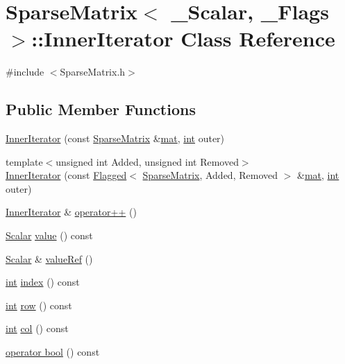 \hypertarget{class_sparse_matrix_1_1_inner_iterator}{\section{Sparse\-Matrix$<$ \-\_\-\-Scalar, \-\_\-\-Flags $>$\-:\-:Inner\-Iterator Class Reference}
\label{class_sparse_matrix_1_1_inner_iterator}
}


{\ttfamily \#include $<$Sparse\-Matrix.\-h$>$}

\subsection*{Public Member Functions}
\begin{DoxyCompactItemize}
\item 
\hyperlink{class_sparse_matrix_1_1_inner_iterator_a17d46297e038b9ec586d19691acdfbfc}{Inner\-Iterator} (const \hyperlink{class_sparse_matrix}{Sparse\-Matrix} \&\hyperlink{uavobjecttemplate_8m_a16a51e808b16c46bbfd36da2e37cd123}{mat}, \hyperlink{ioapi_8h_a787fa3cf048117ba7123753c1e74fcd6}{int} outer)
\item 
{\footnotesize template$<$unsigned int Added, unsigned int Removed$>$ }\\\hyperlink{class_sparse_matrix_1_1_inner_iterator_a15daabe1833b34570420fa92ba33ef6c}{Inner\-Iterator} (const \hyperlink{class_flagged}{Flagged}$<$ \hyperlink{class_sparse_matrix}{Sparse\-Matrix}, Added, Removed $>$ \&\hyperlink{uavobjecttemplate_8m_a16a51e808b16c46bbfd36da2e37cd123}{mat}, \hyperlink{ioapi_8h_a787fa3cf048117ba7123753c1e74fcd6}{int} outer)
\item 
\hyperlink{class_sparse_matrix_1_1_inner_iterator}{Inner\-Iterator} \& \hyperlink{class_sparse_matrix_1_1_inner_iterator_aa5b23a73432afc4b61cc89521793e516}{operator++} ()
\item 
\hyperlink{class_sparse_matrix_base_af39d70f2b7e775e9e17b666cd24128c8}{Scalar} \hyperlink{class_sparse_matrix_1_1_inner_iterator_a95b8f199da2962ce75be20ee8e9358bc}{value} () const 
\item 
\hyperlink{class_sparse_matrix_base_af39d70f2b7e775e9e17b666cd24128c8}{Scalar} \& \hyperlink{class_sparse_matrix_1_1_inner_iterator_a746bab482d56839f89536dad351ed559}{value\-Ref} ()
\item 
\hyperlink{ioapi_8h_a787fa3cf048117ba7123753c1e74fcd6}{int} \hyperlink{class_sparse_matrix_1_1_inner_iterator_aa3015698b1a51a57e9b43182e997a8df}{index} () const 
\item 
\hyperlink{ioapi_8h_a787fa3cf048117ba7123753c1e74fcd6}{int} \hyperlink{class_sparse_matrix_1_1_inner_iterator_a79e77799f1d0fea21df7326588d7b94e}{row} () const 
\item 
\hyperlink{ioapi_8h_a787fa3cf048117ba7123753c1e74fcd6}{int} \hyperlink{class_sparse_matrix_1_1_inner_iterator_a299a2cd6c66e3e13e165accba57a3f0e}{col} () const 
\item 
\hyperlink{class_sparse_matrix_1_1_inner_iterator_aa0873415bd36fdc155ce07d6341de288}{operator bool} () const 
\end{DoxyCompactItemize}

